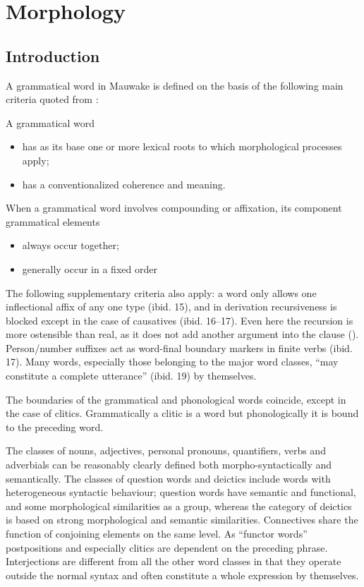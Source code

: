 
\chapter{Morphology}\label{sec:3}
{}
\section{Introduction}\label{sec:3:1}
{}
A grammatical word in Mauwake is defined on the basis of the following main criteria quoted from \citet[12--14]{Dixon2010b}:

A grammatical word
\begin{itemize}
\item has as its base one or more lexical roots to which morphological processes apply;
\item has a conventionalized coherence and meaning.
\end{itemize}
When a grammatical word involves compounding or affixation, its component grammatical elements 

\begin{itemize}
\item always occur together;
\item generally occur in a fixed order
\end{itemize}

The following supplementary criteria also apply: a word only allows one inflectional affix of any one type (ibid. 15), and in derivation recursiveness is blocked except in the case of causatives (ibid. 16--17). Even here the recursion is more ostensible than real, as it does not add another argument into the clause (). Person/number suffixes act as word-final boundary markers in finite verbs (ibid. 17). Many words, especially those belonging to the major word classes, ``may constitute a complete utterance'' (ibid. 19) by themselves. 

The boundaries of the grammatical and phonological words coincide, except in the case of clitics. Grammatically a clitic is a word but phonologically it is bound to the preceding word.

The classes of nouns, adjectives, personal pronouns, quantifiers, verbs and adverbials can be reasonably clearly defined both morpho-syntactically and semantically. The classes of question words and deictics include words with heterogeneous syntactic behaviour; question words have semantic and functional, and some morphological similarities as a group, whereas the category of deictics is based on strong morphological and semantic similarities. Connectives share the function of conjoining elements on the same level. As ``functor words'' postpositions and especially clitics are dependent on the preceding phrase. Interjections are different from all the other word classes in that they operate outside the normal syntax and often constitute a whole expression by themselves.

